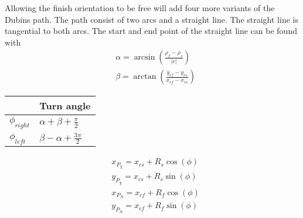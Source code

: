 Allowing the finish orientation to be free will add four more variants of the Dubins path.
The path consist of two arcs and a straight line. The straight line is tangential to both arcs. The start and end point of the straight line can be found with
\begin{subequations}
\begin{align}
& \alpha = \arcsin(\frac{\rho_f-\rho_s}{|c|}) \\
& \beta = \arctan(\frac{y_{cf}-y_{cs}}{x_{cf}-x_{cs}})
\end{align}
\end{subequations}

\begin{table}[H]
\begin{center}
\begin{tabular}{ | l | | l |}
\hline
& \textbf{Turn angle} \\ \hline
$\phi_{right}$ & $\alpha + \beta + \frac{\pi}{2}$ \\
$\phi_{left}$ & $\beta - \alpha + \frac{3\pi}{2}$ \\ \hline
\end{tabular}
\end{center}
\end{table}

\begin{subequations}
\begin{align}
& x_{P_\chi} = x_{cs} + R_s\cos(\phi) \\
& y_{P_\chi} = x_{cs} + R_s\sin(\phi) \\
& x_{P_N} = x_{cf} + R_f\cos(\phi) \\
& y_{P_N} = x_{cf} + R_f\sin(\phi)
\end{align}
\end{subequations}